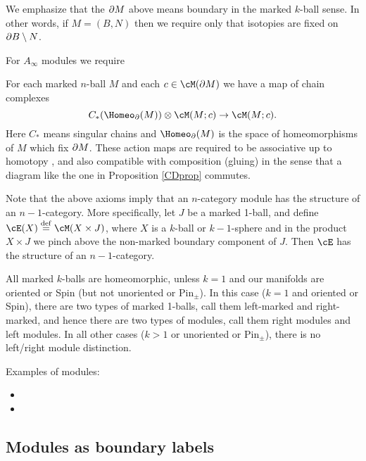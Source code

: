 
We emphasize that the $\partial M$ above means boundary in the marked $k$-ball sense.
In other words, if $M = (B, N)$ then we require only that isotopies are fixed 
on $\partial B \setminus N$.

For $A_\infty$ modules we require

{For each marked $n$-ball $M$ and each $c\in \cM(\bd M)$ we have a map of chain complexes
\[
	C_*(\Homeo_\bd(M))\ot \cM(M; c) \to \cM(M; c) .
\]
Here $C_*$ means singular chains and $\Homeo_\bd(M)$ is the space of homeomorphisms of $M$
which fix $\partial M$.
These action maps are required to be associative up to homotopy
, and also compatible with composition (gluing) in the sense that
a diagram like the one in Proposition \ref{CDprop} commutes.
}

\medskip

Note that the above axioms imply that an $n$-category module has the structure
of an $n{-}1$-category.
More specifically, let $J$ be a marked 1-ball, and define $\cE(X)\deq \cM(X\times J)$,
where $X$ is a $k$-ball or $k{-}1$-sphere and in the product $X\times J$ we pinch 
above the non-marked boundary component of $J$.
Then $\cE$ has the structure of an $n{-}1$-category.

All marked $k$-balls are homeomorphic, unless $k = 1$ and our manifolds
are oriented or Spin (but not unoriented or $\text{Pin}_\pm$).
In this case ($k=1$ and oriented or Spin), there are two types
of marked 1-balls, call them left-marked and right-marked,
and hence there are two types of modules, call them right modules and left modules.
In all other cases ($k>1$ or unoriented or $\text{Pin}_\pm$),
there is no left/right module distinction.

\medskip

Examples of modules:
\begin{itemize}
\item {}
\item {}
\end{itemize}

\subsection{Modules as boundary labels}
\label{moddecss}

